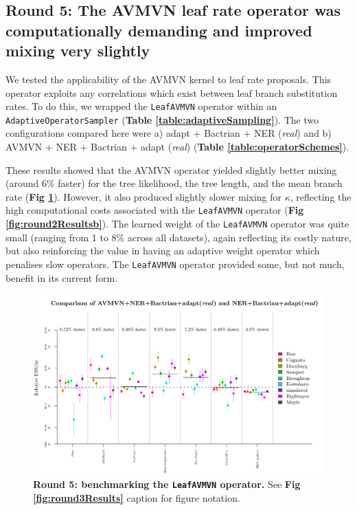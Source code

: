 \documentclass[10pt,letterpaper]{article}
\begin{document}
\clearpage
\subsection*{Round 5: The AVMVN leaf rate operator was computationally demanding and improved mixing very slightly}


We tested the applicability of the AVMVN kernel to leaf rate proposals.
This operator exploits any correlations which exist between leaf branch substitution rates.
To do this, we wrapped the \texttt{LeafAVMVN} operator within an \texttt{AdaptiveOperatorSampler} (\textbf{Table \ref{table:adaptiveSampling}}).
The two configurations compared here were a) adapt + Bactrian + NER (\textit{real}) and b) AVMVN + NER + Bactrian + adapt (\textit{real})  (\textbf{Table \ref{table:operatorSchemes}}).


These results showed that the AVMVN operator yielded slightly better mixing (around 6\% faster) for the tree likelihood, the tree length, and the mean branch rate (\textbf{Fig \ref{fig:round5Results}}).
However, it also produced slightly slower mixing for $\kappa$, reflecting the high computational costs associated with the \texttt{LeafAVMVN} operator (\textbf{Fig \ref{fig:round2Resultsb}}).
The learned weight of the \texttt{LeafAVMVN} operator was quite small (ranging from 1 to 8\% across all datasets), again reflecting its costly nature, but also reinforcing the value in having an adaptive weight operator which penalises slow operators.
The \texttt{LeafAVMVN} operator provided some, but not much, benefit in its current form. 


\begin{figure}[!h]
\includegraphics[width=\textwidth]{benchmarking/benchmarkingVM/ESS_round5.pdf}
\caption{\textbf{Round 5: benchmarking the \texttt{LeafAVMVN} operator.} See \textbf{Fig \ref{fig:round3Results}} caption for figure notation.  }
\label{fig:round5Results}
\end{figure}
\end{document}
